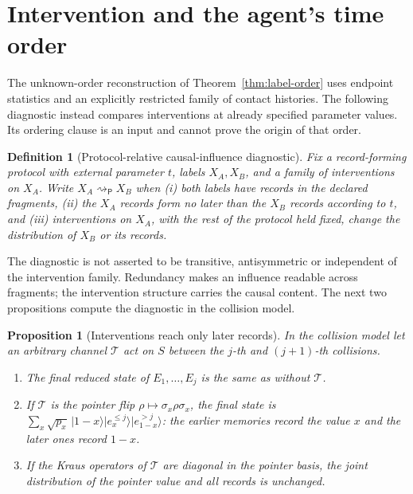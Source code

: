 \documentclass[12pt,a4paper]{article}
\newtheorem{proposition}[theorem]{Proposition}
\newtheorem{definition}[theorem]{Definition}
\begin{document}
\section{Intervention and the agent's time order}
\label{sec:intervention}

The unknown-order reconstruction of Theorem~\ref{thm:label-order}
uses endpoint statistics and an explicitly restricted family of contact
histories. The following diagnostic instead compares interventions
at already specified parameter values. Its ordering clause is an
input and cannot prove the origin of that order.

\begin{definition}[Protocol-relative causal-influence diagnostic]
\label{def:causal}
Fix a record-forming protocol with external parameter $t$, labels $X_A,X_B$, and a family of interventions on $X_A$. Write $X_A\rightsquigarrow_{\mathsf P}X_B$ when (i) both labels have records in the declared fragments, (ii) the $X_A$ records form no later than the $X_B$ records according to $t$, and (iii) interventions on $X_A$, with the rest of the protocol held fixed, change the distribution of $X_B$ or its records.
\end{definition}

The diagnostic is not asserted to be transitive, antisymmetric or independent of the intervention family. Redundancy makes an influence readable across fragments; the intervention structure carries the causal content. The next two propositions compute the diagnostic in the collision model.

\begin{proposition}[Interventions reach only later records]
\label{prop:intervention}
In the collision model let an arbitrary channel $\mathcal T$ act on $S$ between the $j$-th and $(j+1)$-th collisions.
\begin{enumerate}
\item The final reduced state of $E_1,\dots,E_j$ is the same as without $\mathcal T$.
\item If $\mathcal T$ is the pointer flip $\rho\mapsto\sigma_x\rho\sigma_x$, the final state is $\sum_x\sqrt{p_x}\,|1-x\rangle|e^{\le j}_x\rangle|e^{>j}_{1-x}\rangle$: the earlier memories record the value $x$ and the later ones record $1-x$.
\item If the Kraus operators of $\mathcal T$ are diagonal in the pointer basis, the joint distribution of the pointer value and all records is unchanged.
\end{enumerate}
\end{proposition}
\end{document}
